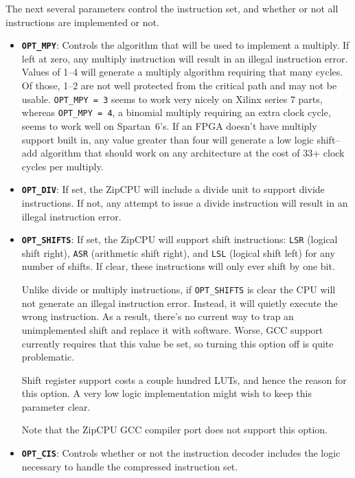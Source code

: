 \documentclass{gqtekspec}
\begin{document}
The next several parameters control the instruction set, and whether or not
all instructions are implemented or not.

\begin{itemize}
\item {\bf\tt OPT\_MPY}: Controls the algorithm that will be used to implement
	a multiply.  If left at zero, any multiply instruction will result in
	an illegal instruction error.  Values of 1--4 will generate a multiply
	algorithm requiring that many cycles.  Of those, 1--2 are not well
	protected from the critical path and may not be usable.
	{\tt  OPT\_MPY = 3} seems to work very nicely on Xilinx series 7 parts,
	whereas {\tt  OPT\_MPY = 4}, a binomial multiply requiring an extra
	clock cycle, seems to work well on Spartan~6's.  If an FPGA doesn't
	have multiply support built in, any value greater than four will
	generate a low logic shift--add algorithm that should work on any
	architecture at the cost of 33+ clock cycles per multiply.

\item {\bf\tt OPT\_DIV}: If set, the ZipCPU will include a divide unit to
	support divide instructions.  If not, any attempt to issue a divide
	instruction will result in an illegal instruction error.

\item {\bf\tt OPT\_SHIFTS}: If set, the ZipCPU will support shift instructions:
	{\tt LSR} (logical shift right), {\tt ASR} (arithmetic shift right),
	and {\tt LSL} (logical shift left) for any number of shifts.  If clear,
	these instructions will only ever shift by one bit.

	Unlike divide or multiply instructions, if {\tt OPT\_SHIFTS} is clear
	the CPU will not generate an illegal instruction error.  Instead, it
	will quietly execute the wrong instruction.  As a result, there's no
	current way to trap an unimplemented shift and replace it with software.
	Worse, GCC support currently requires that this value be set, so
	turning this option off is quite problematic.

	Shift register support costs a couple hundred LUTs, and hence the
	reason for this option.  A very low logic implementation
	might wish to keep this parameter clear.

	Note that the ZipCPU GCC compiler port does not support this option.

\item {\bf\tt OPT\_CIS}: Controls whether or not the instruction decoder
	includes the logic necessary to handle the compressed instruction set.


\end{itemize}
\end{document}
